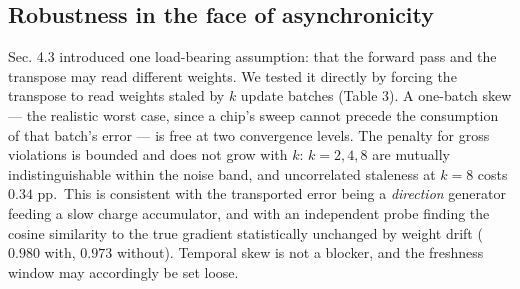 \documentclass[11pt]{article}
\begin{document}
\hypertarget{robustness-in-the-face-of-asynchronicity}{%
\subsection{Robustness in the face of
asynchronicity}\label{robustness-in-the-face-of-asynchronicity}}

Sec. 4.3 introduced one load-bearing assumption: that the forward pass
and the transpose may read different weights. We tested it directly by
forcing the transpose to read weights staled by \(k\) update batches
(Table 3). A one-batch skew --- the realistic worst case, since a chip's
sweep cannot precede the consumption of that batch's error --- is free
at two convergence levels. The penalty for gross violations is bounded
and does not grow with \(k\): \(k = 2, 4, 8\) are mutually
indistinguishable within the noise band, and uncorrelated staleness at
\(k = 8\) costs \(0.34\) pp.~This is consistent with the transported
error being a \emph{direction} generator feeding a slow charge
accumulator, and with an independent probe finding the cosine similarity
to the true gradient statistically unchanged by weight drift (\(0.980\)
with, \(0.973\) without). Temporal skew is not a blocker, and the
freshness window may accordingly be set loose.
\end{document}
